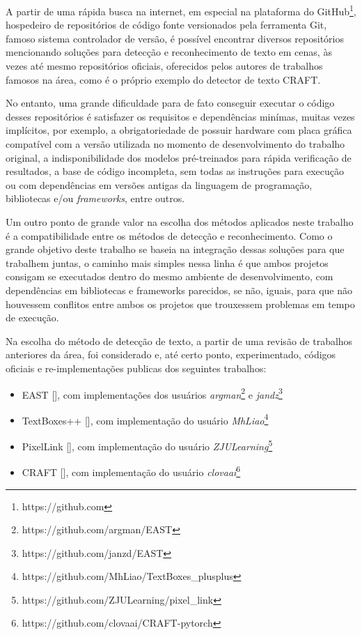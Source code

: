 A partir de uma rápida busca na internet, em especial na plataforma do GitHub\footnote{https://github.com}, hospedeiro de repositórios de código fonte versionados pela ferramenta Git, famoso sistema controlador de versão, é possível encontrar diversos repositórios mencionando soluções para detecção e reconhecimento de texto em cenas, às vezes até mesmo repositórios oficiais, oferecidos pelos autores de trabalhos famosos na área, como é o próprio exemplo do detector de texto CRAFT.

No entanto, uma grande dificuldade para de fato conseguir executar o código desses repositórios é satisfazer os requisitos e dependências minímas, muitas vezes implícitos, por exemplo, a obrigatoriedade de possuir hardware com placa gráfica compatível com a versão utilizada no momento de desenvolvimento do trabalho original, a indisponibilidade dos modelos pré-treinados para rápida verificação de resultados, a base de código incompleta, sem todas as instruções para execução ou com dependências em versões antigas da linguagem de programação, bibliotecas e/ou \textit{frameworks}, entre outros.

Um outro ponto de grande valor na escolha dos métodos aplicados neste trabalho é a compatibilidade entre os métodos de detecção e reconhecimento. Como o grande objetivo deste trabalho se baseia na integração dessas soluções para que trabalhem juntas, o caminho mais simples nessa linha é que ambos projetos consigam se executados dentro do mesmo ambiente de desenvolvimento, com dependências em bibliotecas e frameworks parecidos, se não, iguais, para que não houvessem conflitos entre ambos os projetos que trouxessem problemas em tempo de execução.

Na escolha do método de detecção de texto, a partir de uma revisão de trabalhos anteriores da área, foi considerado e, até certo ponto, experimentado, códigos oficiais e re-implementações publicas dos seguintes trabalhos:

\begin{itemize}
    \item EAST [], com implementações dos usuários \textit{argman}\footnote{https://github.com/argman/EAST} e \textit{jandz}\footnote{https://github.com/janzd/EAST}
    \item TextBoxes++ [], com implementação do usuário \textit{MhLiao}\footnote{https://github.com/MhLiao/TextBoxes\_plusplus}
    \item PixelLink [], com implementação do usuário \textit{ZJULearning}\footnote{https://github.com/ZJULearning/pixel\_link}
    \item CRAFT [], com implementação do usuário \textit{clovaai}\footnote{https://github.com/clovaai/CRAFT-pytorch}
\end{itemize}

